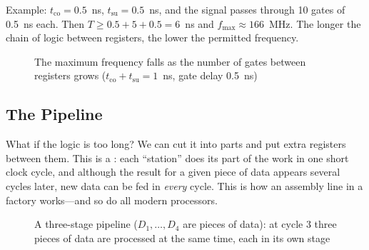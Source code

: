 Example: $t_\text{co} = 0.5$~ns, $t_\text{su} = 0.5$~ns, and the signal passes
through 10 gates of 0.5~ns each. Then
$T \ge 0.5 + 5 + 0.5 = 6$~ns and $f_\text{max} \approx 166$~MHz. The
longer the chain of logic between registers, the lower the permitted
frequency.

\begin{figure}[H]
\centering
{}
\caption{The maximum frequency falls as the number of gates between registers
grows ($t_\text{co}+t_\text{su} = 1$~ns, gate delay 0.5~ns)}
\end{figure}

\subsection{The Pipeline}

What if the logic is too long? We can cut it into parts and put extra
registers between them. This is a : each ``station'' does its
part of the work in one short clock cycle, and although the result for a given
piece of data appears several cycles later, new data can be fed in
\emph{every} cycle. This is how an assembly line in a factory works---and so
do all modern processors.

\begin{figure}[H]
\centering
{}
\caption{A three-stage pipeline ($D_1,\dots,D_4$ are pieces of data): at cycle 3 three
pieces of data are processed at the same time, each in its own stage}
\end{figure}

